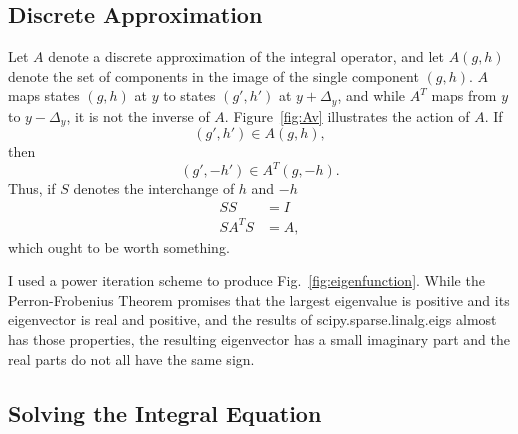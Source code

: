 \documentclass[]{article}
\begin{document}
\subsection{Discrete Approximation}
\label{sec:approximate}

Let $A$ denote a discrete approximation of the integral operator, and
let $A(g,h)$ denote the set of components in the image of the single
component $(g,h)$.  $A$ maps states $(g,h)$ at $y$ to states $(g',h')$
at $y+\Delta_y$, and while $A^T$ maps from $y$ to $y-\Delta_y$, it is
not the inverse of $A$.  Figure~\ref{fig:Av} illustrates the action of
$A$.  If
\begin{equation*}
  (g',h') \in A(g,h),
\end{equation*}
then
\begin{equation*}
  (g', -h') \in A^T(g,-h).
\end{equation*}
Thus, if $S$ denotes the interchange of $h$ and $-h$
\begin{align*}
  SS &= I \\
  SA^TS &= A,
\end{align*}
which ought to be worth something.

\begin{figure*}
  \centering
  \caption{Action of integral operator and its transpose on selected points}
  \label{fig:Av}
\end{figure*}

I used a power iteration scheme to produce
Fig.~\ref{fig:eigenfunction}.  While the Perron-Frobenius Theorem
promises that the largest eigenvalue is positive and its eigenvector
is real and positive, and the results of scipy.sparse.linalg.eigs
almost has those properties, the resulting eigenvector has a small
imaginary part and the real parts do not all have the same sign.
\begin{figure*}
  \centering
  \caption{Eigenfunction of integral operator.}
  \label{fig:eigenfunction}
\end{figure*}

\subsection{Solving the Integral Equation}
\label{sec:solve}
\end{document}
